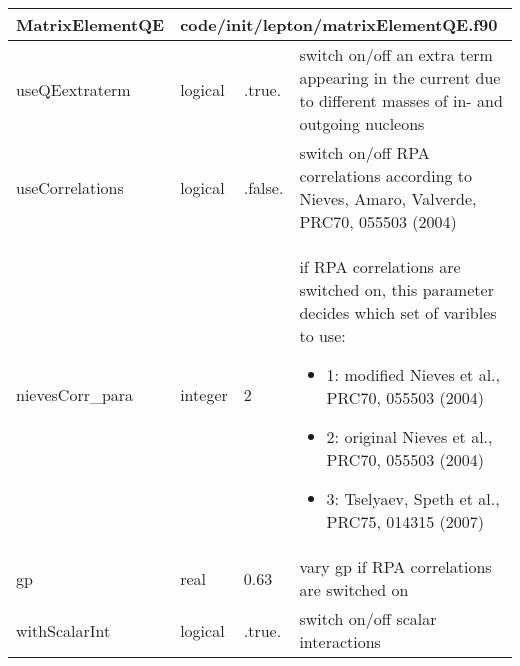 \documentclass{article}
\begin{document}

\begin{longtable}{llll}
\toprule
\textbf{\large{MatrixElementQE}} & \multicolumn{3}{l}{\footnotesize{code/init/lepton/matrixElementQE.f90}}\\*
\midrule
\endfirsthead
\midrule
\endhead
useQEextraterm & \begin{minipage}[t]{2cm}logical\end{minipage} & \begin{minipage}[t]{2cm}.true.\end{minipage} & \begin{minipage}[t]{12cm}switch on/off an extra term appearing in the current due to different masses of in- and outgoing nucleons\end{minipage}\\*
\midrule
useCorrelations & \begin{minipage}[t]{2cm}logical\end{minipage} & \begin{minipage}[t]{2cm}.false.\end{minipage} & \begin{minipage}[t]{12cm}switch on/off RPA correlations according to Nieves, Amaro, Valverde, PRC70, 055503 (2004)\end{minipage}\\*
\midrule
nievesCorr\_para & \begin{minipage}[t]{2cm}integer\end{minipage} & \begin{minipage}[t]{2cm}2\end{minipage} & \begin{minipage}[t]{12cm}if RPA correlations are switched on, this parameter decides which set of varibles to use:\begin{itemize}\leftmargin0em\itemindent0pt\item 1: modified Nieves et al., PRC70, 055503 (2004)\item 2: original Nieves et al., PRC70, 055503 (2004)\item 3: Tselyaev, Speth et al., PRC75, 014315 (2007)\end{itemize}\end{minipage}\\*
\midrule
gp & \begin{minipage}[t]{2cm}real\end{minipage} & \begin{minipage}[t]{2cm}0.63\end{minipage} & \begin{minipage}[t]{12cm}vary gp if RPA correlations are switched on\end{minipage}\\*
\midrule
withScalarInt & \begin{minipage}[t]{2cm}logical\end{minipage} & \begin{minipage}[t]{2cm}.true.\end{minipage} & \begin{minipage}[t]{12cm}switch on/off scalar interactions\end{minipage}\\*
\bottomrule
\end{longtable}
\end{document}
